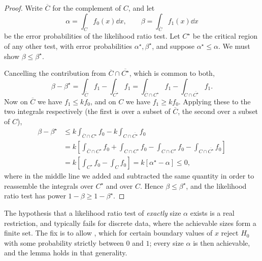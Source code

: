 \documentclass[a4paper]{scrartcl}
\begin{document}
\begin{proof}
  Write $\overline{C}$ for the complement of $C$, and let
  $$
  \alpha = \int_C f_0(x)\dd x, \qquad \beta = \int_{\overline{C}}f_1(x)\dd x
  $$
  be the error probabilities of the likelihood ratio test. Let $C^\star$ be the critical region of any other test, with error probabilities $\alpha^\star, \beta^\star$, and suppose $\alpha^\star \leq \alpha$. We must show $\beta \leq \beta^\star$.

  Cancelling the contribution from $\overline{C}\cap\overline{C^\star}$, which is common to both,
  $$
  \beta - \beta^\star = \int_{\overline{C}}f_1 - \int_{\overline{C^\star}}f_1 = \int_{\overline{C}\cap C^\star}f_1 - \int_{C \cap \overline{C^\star}}f_1.
  $$
  Now on $\overline{C}$ we have $f_1 \leq k f_0$, and on $C$ we have $f_1 \geq k f_0$. Applying these to the two integrals respectively (the first is over a subset of $\overline C$, the second over a subset of $C$),
  \begin{align*}
    \beta - \beta^\star &\leq k\int_{\overline{C}\cap C^\star}f_0 - k\int_{C\cap\overline{C^\star}}f_0\\
    &= k\left[\int_{\overline{C}\cap C^\star}f_0 + \int_{C\cap C^\star}f_0 - \int_{C \cap C^\star}f_0 - \int_{C\cap \overline{C^\star}}f_0\right]\\
    &= k\left[\int_{C^\star}f_0 - \int_C f_0\right] = k\left[\alpha^\star - \alpha\right] \leq 0,
  \end{align*}
  where in the middle line we added and subtracted the same quantity in order to reassemble the integrals over $C^\star$ and over $C$. Hence $\beta \leq \beta^\star$, and the likelihood ratio test has power $1 - \beta \geq 1 - \beta^\star$.
\end{proof}

\begin{remark}
  The hypothesis that a likelihood ratio test of \emph{exactly} size $\alpha$ exists is a real restriction, and typically fails for discrete data, where the achievable sizes form a finite set. The fix is to allow , which for certain boundary values of $x$ reject $H_0$ with some probability strictly between $0$ and $1$; every size $\alpha$ is then achievable, and the lemma holds in that generality.
\end{remark}
\end{document}
